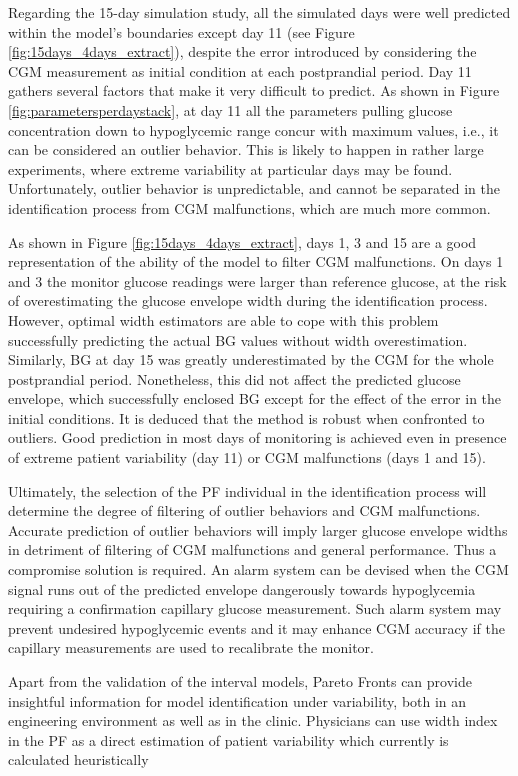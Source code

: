 Regarding the 15-day simulation study, all the simulated days were well predicted within the model's boundaries except day 11 (see Figure \ref{fig:15days_4days_extract}), despite the error introduced by considering the CGM measurement as initial condition at each postprandial period. Day 11 gathers several factors that make it very difficult to predict.  As shown in Figure \ref{fig:parametersperdaystack}, at day 11 all the parameters pulling glucose concentration down to hypoglycemic range concur with maximum values, i.e., it can be considered an outlier behavior. This is likely to happen in rather large experiments, where extreme variability at particular days may be found. Unfortunately, outlier behavior is unpredictable, and cannot be separated in the identification process from CGM malfunctions, which are much more common. 

As shown in Figure \ref{fig:15days_4days_extract}, days 1, 3 and 15 are a good representation of the ability of the model to filter CGM malfunctions. On days 1 and 3 the monitor glucose readings were larger than reference glucose, at the risk of overestimating the glucose envelope width during the identification process. However, optimal width estimators are able to cope with this problem successfully predicting the actual BG values without width overestimation. Similarly, BG at day 15 was greatly underestimated by the CGM for the whole postprandial period. Nonetheless, this did not affect the predicted glucose envelope, which successfully enclosed BG except for the effect of the error in the initial conditions. It is deduced that the method is robust when confronted to outliers. Good prediction in most days of monitoring is achieved even in presence of extreme patient variability (day 11) or CGM malfunctions (days 1 and 15). 

Ultimately, the selection of the PF individual in the identification process will determine the degree of filtering of outlier behaviors and CGM malfunctions. Accurate prediction of outlier behaviors will imply larger glucose envelope widths in detriment of filtering of CGM malfunctions and general performance. Thus a compromise solution is required. An alarm system can be devised when the CGM signal runs out of the predicted envelope dangerously towards hypoglycemia requiring a confirmation capillary glucose measurement. Such alarm system may prevent undesired hypoglycemic events and it may enhance CGM accuracy if the capillary measurements are used to recalibrate the monitor.

Apart from the validation of the interval models, Pareto Fronts can provide insightful information for model identification under variability, both in an engineering environment as well as in the clinic. Physicians can use width index in the PF as a direct estimation of patient variability which currently is calculated heuristically


